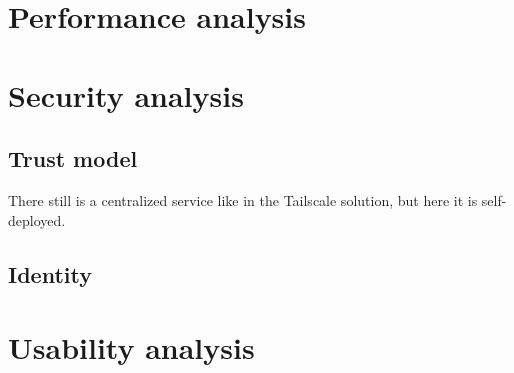 \hypertarget{performance-analysis}{%
\section{Performance analysis}\label{performance-analysis}}

\hypertarget{security-analysis}{%
\section{Security analysis}\label{security-analysis}}

\hypertarget{trust-model}{%
\subsection{Trust model}\label{trust-model}}

There still is a centralized service like in the Tailscale solution, but
here it is self-deployed.

\hypertarget{identity}{%
\subsection{Identity}\label{identity}}

\hypertarget{usability-analysis}{%
\section{Usability analysis}\label{usability-analysis}}
